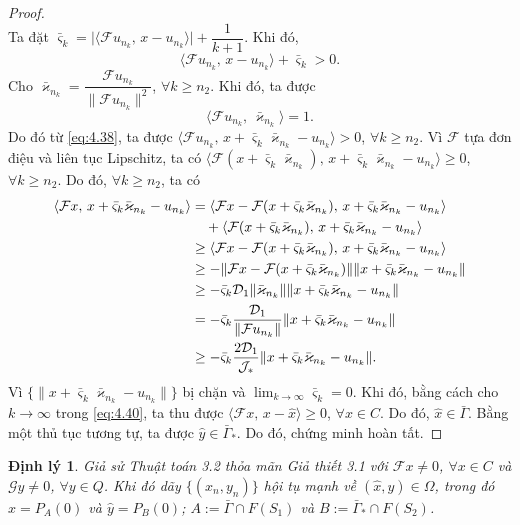 \documentclass[11pt,a4paper]{article}
\theoremstyle{plain}
\newtheorem{theorem}{Định lý}[section]
\theoremstyle{definition}
\theoremstyle{remark}
\numberwithin{equation}{section}
\newcommand{\Fc}{\mathcal{F}}
\newcommand{\Gc}{\mathcal{G}}
\newcommand{\Dc}{\mathcal{D}}
\newcommand{\inp}[2]{\langle #1,\,#2\rangle}
\newcommand{\nm}[1]{\lVert #1\rVert}
\newcommand{\abs}[1]{\lvert #1\rvert}
\newcommand{\Gam}{\bar{\Gamma}}
\newcommand{\Gams}{\bar{\Gamma}_{*}}
\newcommand{\Fix}[1]{F(#1)}
\begin{document}
\begin{proof}
\[\]
Ta đặt $\bar{\varsigma}_k=\abs{\inp{\Fc u_{n_k}}{x-u_{n_k}}}+\dfrac{1}{k+1}$. Khi đó,
\begin{equation}
\inp{\Fc u_{n_k}}{x-u_{n_k}}+\bar{\varsigma}_k>0. \label{eq:4.38}
\end{equation}
Cho $\bar{\varkappa}_{n_k}=\dfrac{\Fc u_{n_k}}{\nm{\Fc u_{n_k}}^2}$, $\forall k\ge n_2$. Khi đó, ta được
\begin{equation}
\inp{\Fc u_{n_k}}{\bar{\varkappa}_{n_k}}=1. \label{eq:4.39}
\end{equation}
Do đó từ \eqref{eq:4.38}, ta được $\inp{\Fc u_{n_k}}{x+\bar{\varsigma}_k\bar{\varkappa}_{n_k}-u_{n_k}}>0$, $\forall k\ge n_2$. Vì $\Fc$ tựa đơn điệu và liên tục Lipschitz, ta có $\inp{\Fc(x+\bar{\varsigma}_k\bar{\varkappa}_{n_k})}{x+\bar{\varsigma}_k\bar{\varkappa}_{n_k}-u_{n_k}}\ge 0$, $\forall k\ge n_2$. Do đó, $\forall k\ge n_2$, ta có
\begin{align}
\inp{\Fc x}{x+\bar{\varsigma}_k\bar{\varkappa}_{n_k}-u_{n_k}} &= \inp{\Fc x-\Fc(x+\bar{\varsigma}_k\bar{\varkappa}_{n_k})}{x+\bar{\varsigma}_k\bar{\varkappa}_{n_k}-u_{n_k}}\notag\\
&\quad +\inp{\Fc(x+\bar{\varsigma}_k\bar{\varkappa}_{n_k})}{x+\bar{\varsigma}_k\bar{\varkappa}_{n_k}-u_{n_k}}\notag\\
&\ge \inp{\Fc x-\Fc(x+\bar{\varsigma}_k\bar{\varkappa}_{n_k})}{x+\bar{\varsigma}_k\bar{\varkappa}_{n_k}-u_{n_k}}\notag\\
&\ge -\nm{\Fc x-\Fc(x+\bar{\varsigma}_k\bar{\varkappa}_{n_k})}\nm{x+\bar{\varsigma}_k\bar{\varkappa}_{n_k}-u_{n_k}}\notag\\
&\ge -\bar{\varsigma}_k\Dc_1\nm{\bar{\varkappa}_{n_k}}\nm{x+\bar{\varsigma}_k\bar{\varkappa}_{n_k}-u_{n_k}}\notag\\
&= -\bar{\varsigma}_k\frac{\Dc_1}{\nm{\Fc u_{n_k}}}\nm{x+\bar{\varsigma}_k\bar{\varkappa}_{n_k}-u_{n_k}}\notag\\
&\ge -\bar{\varsigma}_k\frac{2\Dc_1}{\mathcal{J}_{*}}\nm{x+\bar{\varsigma}_k\bar{\varkappa}_{n_k}-u_{n_k}}. \label{eq:4.40}
\end{align}
Vì $\{\nm{x+\bar{\varsigma}_k\bar{\varkappa}_{n_k}-u_{n_k}}\}$ bị chặn và $\lim_{k\to\infty}\bar{\varsigma}_k=0$. Khi đó, bằng cách cho $k\to\infty$ trong \eqref{eq:4.40}, ta thu được $\inp{\Fc x}{x-\hat{x}}\ge 0$, $\forall x\in C$. Do đó, $\hat{x}\in\Gam$. Bằng một thủ tục tương tự, ta được $\hat{y}\in\Gams$. Do đó, chứng minh hoàn tất.
\end{proof}

\begin{theorem}\label{thm:4.8}
Giả sử Thuật toán 3.2 thỏa mãn Giả thiết 3.1 với $\Fc x\ne 0$, $\forall x\in C$ và $\Gc y\ne 0$, $\forall y\in Q$. Khi đó dãy $\{(x_n,y_n)\}$ hội tụ mạnh về $(\hat{x},\hat{y})\in\Omega$, trong đó $\hat{x}=P_A(0)$ và $\hat{y}=P_B(0)$; $A:=\Gam\cap \Fix{S_1}$ và $B:=\Gams\cap \Fix{S_2}$.
\end{theorem}
\end{document}

